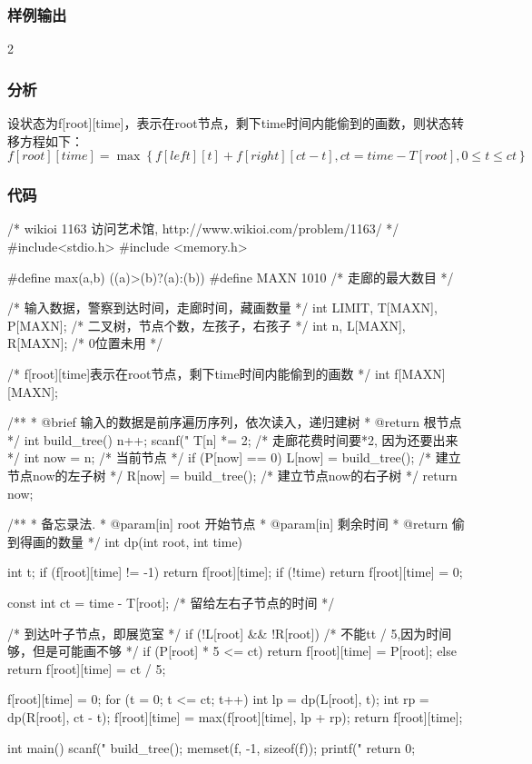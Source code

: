 \subsubsection{样例输出}
\begin{Code}
2
\end{Code}

\subsubsection{分析}
设状态为f[root][time]，表示在root节点，剩下time时间内能偷到的画数，则状态转移方程如下：
$$
f[root][time]=\max\left\{f[left][t]+f[right][ct-t], ct=time-T[root],0 \leq t \leq ct\right\}
$$

\subsubsection{代码}

\begin{Codex}[label=art_gallery.c]
/* wikioi 1163 访问艺术馆, http://www.wikioi.com/problem/1163/ */
#include<stdio.h>
#include <memory.h>

#define max(a,b) ((a)>(b)?(a):(b))
#define MAXN  1010  /* 走廊的最大数目 */

/* 输入数据，警察到达时间，走廊时间，藏画数量 */
int LIMIT, T[MAXN], P[MAXN];
/* 二叉树，节点个数，左孩子，右孩子 */
int n, L[MAXN], R[MAXN]; /* 0位置未用 */

/* f[root][time]表示在root节点，剩下time时间内能偷到的画数 */
int f[MAXN][MAXN];

/**
 * @brief 输入的数据是前序遍历序列，依次读入，递归建树
 * @return 根节点
 */
int build_tree() {
    n++;
    scanf("%
    T[n] *= 2; /* 走廊花费时间要*2, 因为还要出来 */
    int now = n; /* 当前节点 */
    if (P[now] == 0) {
        L[now] = build_tree();  /* 建立节点now的左子树 */
        R[now] = build_tree();  /* 建立节点now的右子树 */
    }
    return now;
}

/**
 * 备忘录法.
 * @param[in] root 开始节点
 * @param[in] 剩余时间
 * @return 偷到得画的数量
 */
int dp(int root, int time) {
    int t;
    if (f[root][time] != -1)
        return f[root][time];
    if (!time)
        return f[root][time] = 0;

    const int ct = time - T[root]; /* 留给左右子节点的时间 */

    /* 到达叶子节点，即展览室 */
    if (!L[root] && !R[root]) {
        /* 不能tt / 5,因为时间够，但是可能画不够 */
        if (P[root] * 5 <= ct)
            return f[root][time] = P[root];
        else
            return f[root][time] = ct / 5;
    }

    f[root][time] = 0;
    for (t = 0; t <= ct; t++) {
        int lp = dp(L[root], t);
        int rp = dp(R[root], ct - t);
        f[root][time] = max(f[root][time], lp + rp);
    }
    return f[root][time];
}

int main() {
    scanf("%
    build_tree();
    memset(f, -1, sizeof(f));
    printf("%
    return 0;
}
\end{Codex}

